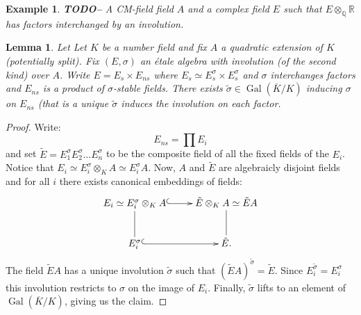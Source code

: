 \documentclass{article}
\theoremstyle{plain}
\newtheorem{lemma}[theorem]{Lemma}
\newtheorem{example}[theorem]{Example}
\theoremstyle{definition}
\DeclareMathOperator{\Gal}{Gal}
\newcommand{\RR}{\mathbb{R}}
\newcommand{\QQ}{\mathbb{Q}}
\newcommand{\TODO}[1]{\textbf{TODO-#1}}
\begin{document}
\begin{example}
\TODO - A CM-field field $A$ and a complex field $E$ such that $E\otimes_\QQ \RR$ has factors interchanged by an involution.
\end{example}


\begin{lemma}\label{Lem:liftsigma}
Let Let $K$ be a number field and fix $A$ a quadratic extension of $K$ (potentially split).
Fix $(E,\sigma)$ an \'etale algebra with involution (of the second kind) over $A$.
Write $E = E_s \times E_{ns}$ where $E_s \simeq E_s^\sigma \times E_s^\sigma$ and $\sigma$ interchanges factors and $E_{ns}$ is a product of $\sigma$-stable fields.
There exists $\tilde{\sigma} \in \Gal(\overline{K}/K)$ inducing $\sigma$ on $E_{ns}$ (that is a unique $\tilde{\sigma}$ induces the involution on each factor.
\end{lemma}
\begin{proof}
Write:
\[ E_{ns} = \prod E_i \]
and set $\tilde{E} = E_1^\sigma E_2^\sigma\ldots E_{n}^\sigma$ to be the composite field of all the fixed fields of the $E_i$.
Notice that $E_i \simeq E_i^\sigma\otimes_K A \simeq E_i^\sigma A$.
Now, $A$ and $\tilde{E}$ are algebraicly disjoint fields and for all $i$ there exists canonical embeddings of fields:
\[ \xymatrix{ E_i \simeq E_i^\sigma\otimes_K A \ar@{^(->}[r]\ar@{-}[d] &  \tilde{E} \otimes_K A \simeq \tilde{E}A \ar@{-}[d] \\ 
                      E_i^\sigma \ar@{^(->}[r]\ar@{-} & \tilde{E}.}
 \]
The field $\tilde{E}A$ has a unique involution $\tilde{\sigma}$ such that $(\tilde{E}A)^{\tilde{\sigma}} = \tilde{E}$. Since $E_i^{\tilde{\sigma}} = E_i^\sigma$ this involution restricts to $\sigma$ on the image of $E_i$.
Finally, $\tilde{\sigma}$ lifts to an element of $\Gal(\overline{K}/K)$, giving us the claim.
\end{proof}
\end{document}
